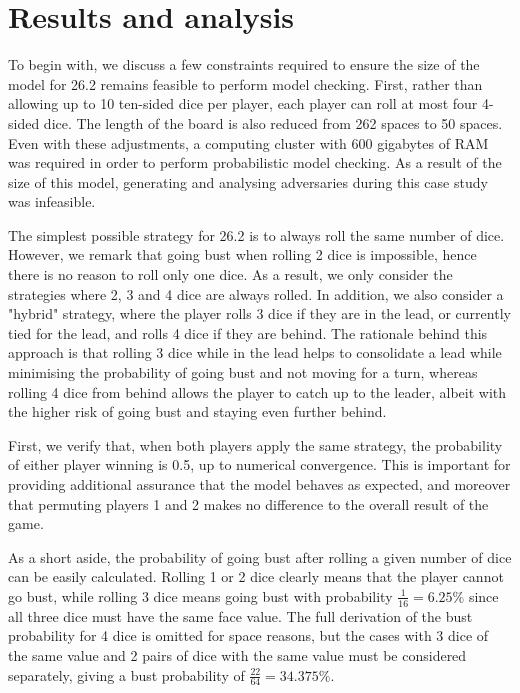 \section{Results and analysis}

To begin with, we discuss a few constraints required to ensure the size of the model for 26.2 remains feasible to perform model checking. First, rather than allowing up to 10 ten-sided dice per player, each player can roll at most four 4-sided dice. The length of the board is also reduced from 262 spaces to 50 spaces. Even with these adjustments, a computing cluster with 600 gigabytes of RAM was required in order to perform probabilistic model checking. As a result of the size of this model, generating and analysing adversaries during this case study was infeasible.

The simplest possible strategy for 26.2 is to always roll the same number of dice. However, we remark that going bust when rolling 2 dice is impossible, hence there is no reason to roll only one dice. As a result, we only consider the strategies where 2, 3 and 4 dice are always rolled. In addition, we also consider a "hybrid" strategy, where the player rolls 3 dice if they are in the lead, or currently tied for the lead, and rolls 4 dice if they are behind. The rationale behind this approach is that rolling 3 dice while in the lead helps to consolidate a lead while minimising the probability of going bust and not moving for a turn, whereas rolling 4 dice from behind allows the player to catch up to the leader, albeit with the higher risk of going bust and staying even further behind. 

First, we verify that, when both players apply the same strategy, the probability of either player winning is 0.5, up to numerical convergence. This is important for providing additional assurance that the model behaves as expected, and moreover that permuting players 1 and 2 makes no difference to the overall result of the game.

As a short aside, the probability of going bust after rolling a given number of dice can be easily calculated. Rolling 1 or 2 dice clearly means that the player cannot go bust, while rolling 3 dice means going bust with probability $\frac{1}{16} = 6.25\% $ since all three dice must have the same face value. The full derivation of the bust probability for 4 dice is omitted for space reasons, but the cases with 3 dice of the same value and 2 pairs of dice with the same value must be considered separately, giving a bust probability of $\frac{22}{64} = 34.375\%$.

